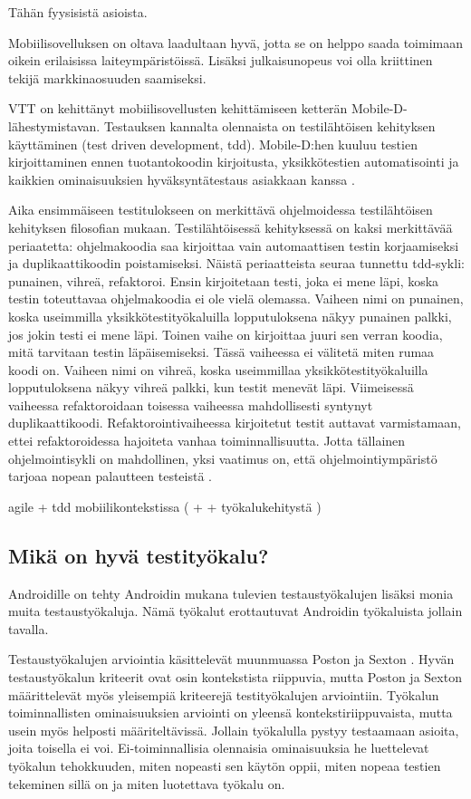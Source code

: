 Tähän fyysisistä asioista.

Mobiilisovelluksen on oltava laadultaan hyvä, jotta se on helppo saada toimimaan oikein erilaisissa laiteympäristöissä. Lisäksi julkaisunopeus voi olla kriittinen tekijä markkinaosuuden saamiseksi.

VTT on kehittänyt mobiilisovellusten kehittämiseen ketterän Mobile-D-lähestymistavan. Testauksen kannalta olennaista on testilähtöisen kehityksen käyttäminen (test driven development, tdd). Mobile-D:hen kuuluu testien kirjoittaminen ennen tuotantokoodin kirjoitusta, yksikkötestien automatisointi ja kaikkien ominaisuuksien hyväksyntätestaus asiakkaan kanssa \cite{abrahamsson04}.

Aika ensimmäiseen testitulokseen on merkittävä ohjelmoidessa testilähtöisen kehityksen filosofian mukaan. Testilähtöisessä kehityksessä on kaksi merkittävää periaatetta: ohjelmakoodia saa kirjoittaa vain automaattisen testin korjaamiseksi ja duplikaattikoodin poistamiseksi. Näistä periaatteista seuraa tunnettu tdd-sykli: punainen, vihreä, refaktoroi. Ensin kirjoitetaan testi, joka ei mene läpi, koska testin toteuttavaa ohjelmakoodia ei ole vielä olemassa. Vaiheen nimi on punainen, koska useimmilla yksikkötestityökaluilla lopputuloksena näkyy punainen palkki, jos jokin testi ei mene läpi. Toinen vaihe on kirjoittaa juuri sen verran koodia, mitä tarvitaan testin läpäisemiseksi. Tässä vaiheessa ei välitetä miten rumaa koodi on. Vaiheen nimi on vihreä, koska useimmillaa yksikkötestityökaluilla lopputuloksena näkyy vihreä palkki, kun testit menevät läpi. Viimeisessä vaiheessa refaktoroidaan toisessa vaiheessa mahdollisesti syntynyt duplikaattikoodi. Refaktorointivaiheessa kirjoitetut testit auttavat varmistamaan, ettei refaktoroidessa hajoiteta vanhaa toiminnallisuutta. Jotta tällainen ohjelmointisykli on mahdollinen, yksi vaatimus on, että ohjelmointiympäristö tarjoaa nopean palautteen testeistä \cite{tdd}.

agile + tdd mobiilikontekstissa (\cite{mobiled} +  +  työkalukehitystä \cite{spataru10})

\subsection{Mikä on hyvä testityökalu?}

Androidille on tehty Androidin mukana tulevien testaustyökalujen lisäksi monia muita testaustyökaluja. Nämä työkalut erottautuvat Androidin työkaluista jollain tavalla.

Testaustyökalujen arviointia käsittelevät muunmuassa Poston ja Sexton \cite{poston92}. Hyvän testaustyökalun kriteerit ovat osin kontekstista riippuvia, mutta Poston ja Sexton määrittelevät myös yleisempiä kriteerejä testityökalujen arviointiin. Työkalun toiminnallisten ominaisuuksien arviointi on yleensä kontekstiriippuvaista, mutta usein myös helposti määriteltävissä. Jollain työkalulla pystyy testaamaan asioita, joita toisella ei voi. Ei-toiminnallisia olennaisia ominaisuuksia he luettelevat työkalun tehokkuuden, miten nopeasti sen käytön oppii, miten nopeaa testien tekeminen sillä on ja miten luotettava työkalu on.

